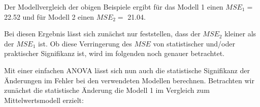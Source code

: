 \documentclass[]{article}
\newenvironment{Shaded}{\begin{snugshade}}{\end{snugshade}}
\newcommand{\KeywordTok}[1]{\textcolor[rgb]{0.13,0.29,0.53}{\textbf{#1}}}
\newcommand{\DataTypeTok}[1]{\textcolor[rgb]{0.13,0.29,0.53}{#1}}
\newcommand{\DecValTok}[1]{\textcolor[rgb]{0.00,0.00,0.81}{#1}}
\newcommand{\StringTok}[1]{\textcolor[rgb]{0.31,0.60,0.02}{#1}}
\newcommand{\CommentTok}[1]{\textcolor[rgb]{0.56,0.35,0.01}{\textit{#1}}}
\newcommand{\OperatorTok}[1]{\textcolor[rgb]{0.81,0.36,0.00}{\textbf{#1}}}
\newcommand{\NormalTok}[1]{#1}
\begin{document}
Der Modellvergleich der obigen Beispiele ergibt für das Modell 1 einen
\(MSE_1 =\) 22.52 und für Modell 2 einen \(MSE_2 =\) 21.04.

Bei diesen Ergebnis lässt sich zunächst nur feststellen, dass der
\(MSE_2\) kleiner als der \(MSE_1\) ist. Ob diese Verringerung des
\(MSE\) von statistischer und/oder praktischer Signifikanz ist, wird im
folgenden noch genauer betrachtet.

Mit einer einfachen ANOVA lässt sich nun auch die statistische
Signifikanz der Änderungen im Fehler bei den verwendeten Modellen
berechnen. Betrachten wir zunächst die statistische Änderung die Modell
1 im Vergleich zum Mittelwertsmodell erzielt:

\begin{Shaded}
\end{Shaded}
\end{document}
